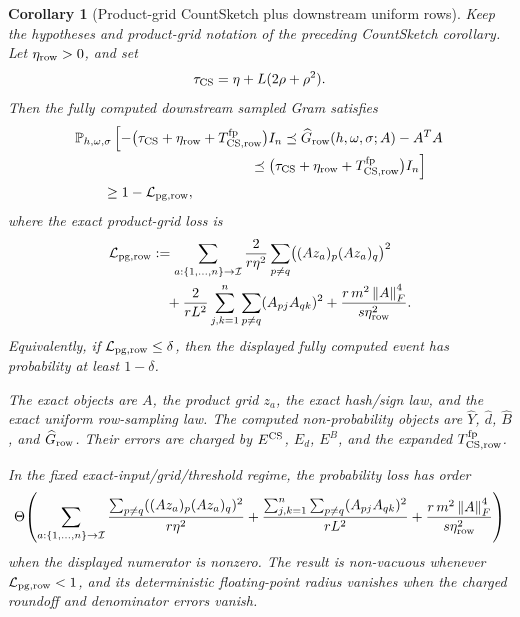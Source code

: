 \documentclass[11pt]{article}
\newcommand{\Prob}{\mathbb{P}}
\newcommand{\Frob}[1]{\left\lVert #1\right\rVert_F}
\newcommand{\I}{I}
\newtheorem{corollary}[theorem]{Corollary}
\theoremstyle{remark}
\begin{document}
\begin{corollary}[Product-grid CountSketch plus downstream uniform rows]
Keep the hypotheses and product-grid notation of the preceding CountSketch
corollary.  Let \(\eta_{\rm row}>0\), and set
\[
  \tau_{\rm CS}=\eta+L(2\rho+\rho^2).
\]
Then the fully computed downstream sampled Gram satisfies
\[
\begin{aligned}
&\Prob_{h,\omega,\sigma}
  \left[
    -\bigl(\tau_{\rm CS}+\eta_{\rm row}
      +T_{\rm CS,row}^{\rm fp}\bigr)\I_n
    \preceq
    \widehat G_{\rm row}(h,\omega,\sigma;A)-A^TA
  \right.
\\[-2pt]
&\left.\hspace{4.4cm}
    \preceq
    \bigl(\tau_{\rm CS}+\eta_{\rm row}
      +T_{\rm CS,row}^{\rm fp}\bigr)\I_n
  \right]
\\
&\qquad\ge
  1-\mathcal L_{\rm pg,row},
\end{aligned}
\]
where the exact product-grid loss is
\[
\begin{aligned}
  \mathcal L_{\rm pg,row}
  &:=
  \sum_{a:\{1,\ldots,n\}\to\mathcal I}
    \frac{2}{r\eta^2}
      \sum_{p\ne q}
        \bigl((Az_a)_p(Az_a)_q\bigr)^2
\\
&\quad+
  \frac{2}{rL^2}
    \sum_{j,k=1}^{n}\sum_{p\ne q}
      (A_{pj}A_{qk})^2
  +
  \frac{r\,m^2\Frob{A}^4}{s\eta_{\rm row}^2}.
\end{aligned}
\]
Equivalently, if \(\mathcal L_{\rm pg,row}\le\delta\), then the displayed
fully computed event has probability at least \(1-\delta\).

The exact objects are \(A\), the product grid \(z_a\), the exact hash/sign
law, and the exact uniform row-sampling law.  The computed non-probability
objects are \(\widehat Y\), \(\widehat d\), \(\widehat B\), and
\(\widehat G_{\rm row}\).  Their errors are charged by
\(E^{\rm CS}\), \(E_d\), \(E^B\), and the expanded
\(T_{\rm CS,row}^{\rm fp}\).

In the fixed exact-input/grid/threshold regime, the probability loss has order
\[
  \Theta\!\left(
    \sum_{a:\{1,\ldots,n\}\to\mathcal I}
      \frac{\sum_{p\ne q}((Az_a)_p(Az_a)_q)^2}{r\eta^2}
    +
    \frac{\sum_{j,k=1}^{n}\sum_{p\ne q}(A_{pj}A_{qk})^2}{rL^2}
    +
    \frac{r\,m^2\Frob{A}^4}{s\eta_{\rm row}^2}
  \right)
\]
when the displayed numerator is nonzero.  The result is non-vacuous whenever
\(\mathcal L_{\rm pg,row}<1\), and its deterministic floating-point radius
vanishes when the charged roundoff and denominator errors vanish.
\end{corollary}
\end{document}
